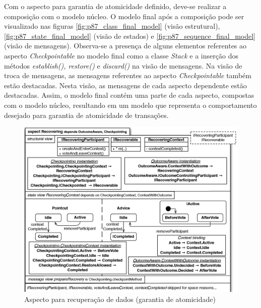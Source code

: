 Com o aspecto para garantia de atomicidade definido, deve-se realizar a composição com o modelo núcleo. O modelo final após a composição pode ser
visualizado nas figuras \ref{fig:p87_class_final_model} (visão estrutural), \ref{fig:p87_state_final_model} (visão de estados) e \ref{fig:p87_sequence_final_model} (visão de mensagens). 
Observa-se a presença de alguns elementos referentes ao aspecto \textit{Checkpointable} no modelo final como a classe \textit{Stack} e a inserção dos métodos \textit{establish(),
restore()} e \textit{discard()} na visão de mensagens. Na visão de troca de mensagens, as mensagens referentes ao aspecto \textit{Checkpointable}
também estão destacadas. Nesta visão, as mensagens de cada aspecto dependente estão destacadas. Assim, o modelo final contém uma parte de cada
aspecto, compostas com o modelo núcleo, resultando em um modelo que representa o comportamento desejado para garantia de atomicidade de transações.

\begin{landscape}
\begin{figure}
	\centering
	\includegraphics[width=450px]{img/p87_recovering_aspect.png}
	\caption{Aspecto para recuperação de dados (garantia de atomicidade)}\label{fig:p87_recovering_aspect.png}
\end{figure}
\end{landscape}

